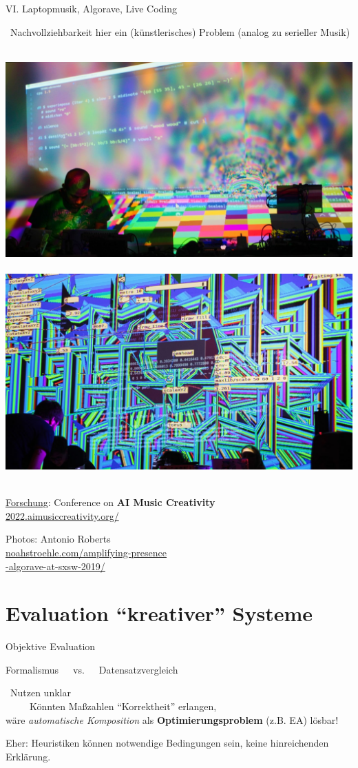\begin{frame}[t]{VI. \dimSixTitle}{Laptopmusik, Algorave, Live Coding}

\Conclude~Nachvollziehbarkeit hier ein (künstlerisches) Problem
(analog zu serieller Musik)
\vspace{-.5cm}
\begin{center}
	\mbox{
		\includegraphics[width=.5\textwidth]{img/Algorave4_ByAntonioRoberts-1440x810.jpg}
		\includegraphics[width=.5\textwidth]{img/Algorave3_ByAntonioRoberts-1440x810.jpg}
	}
\end{center}

\underline{Forschung}: Conference on \textbf{AI Music Creativity}\\
\hspace{2.2cm}\url{2022.aimusiccreativity.org/}

\vspace{-1.2cm}
\tiny
\hfill \textcopyright Photos: Antonio Roberts\\
\hfill \url{noahstroehle.com/amplifying-presence}\\
\hfill \url{-algorave-at-sxsw-2019/}
\end{frame}

\section{Evaluation \enquote{kreativer} Systeme}

\begin{frame}{Objektive Evaluation}
	
	\begin{center}
		{\Large Formalismus~~~vs.~~~Datensatzvergleich}
	\end{center}
	\bigskip

	\warnSign~Nutzen unklar\\
	\smallskip
	~~~~\conclude~Könnten Maßzahlen \enquote{Korrektheit} erlangen,\\
	\hfill wäre \emph{automatische Komposition} als \textbf{Optimierungsproblem} (z.B. EA) lösbar!\\
	\bigskip
	
	Eher: Heuristiken können notwendige Bedingungen sein, keine hinreichenden Erklärung.
\end{frame}

